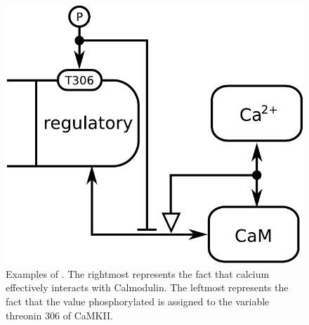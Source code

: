 \begin{figure}[H]
  \centering
  \includegraphics[scale = 0.5]{examples/ex-outcome}
  \caption{Examples of . The rightmost represents the fact that calcium effectively interacts with Calmodulin. The leftmost represents the fact that the value phosphorylated is assigned to the variable threonin 306 of CaMKII.}
  \label{fig:ex-outcome}
\end{figure}

\normalcolor
	
